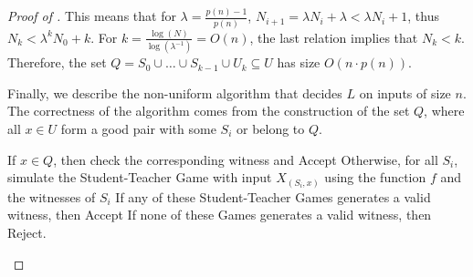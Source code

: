 \documentclass[11pt]{article}
\newcommand{\poly}{\mathsf{poly}}
\theoremstyle{definition}
\theoremstyle{definition}
\theoremstyle{remark}
\begin{document}
\begin{proof}[Proof of ]
    This means that for $\lambda=\frac{p(n)-1}{p(n)}$, $N_{i+1}=\lambda N_i+\lambda<\lambda N_i+1$, thus $N_k<\lambda^k N_0+k$. For $k=\frac{\log(N)}{\log (\lambda^{-1})}=O(n)$, the last relation implies that $N_k<k$. Therefore, the set $Q=S_0\cup\dots\cup S_{k-1}\cup U_k\subseteq U$ has size $O(n\cdot p(n))$.

    Finally, we describe the non-uniform algorithm that decides $L$ on inputs of size $n$. The correctness of the algorithm comes from the construction of the set $Q$, where all $x\in U$ form a good pair with some $S_i$ or belong to $Q$.

\begin{algorithm}[H]
     \caption{The pseudocode of the $\Delta^p_{i+1}/\poly$-algorithm that decides $L$ on input size $n$.}
     \vspace{0.3em}
     If $x\in Q$, then check the corresponding witness and Accept\;
     Otherwise, for all $S_i$, simulate the Student-Teacher Game with input $X_{(S_i,x)}$ using the function $f$ and the witnesses of $S_i$\;
     If any of these Student-Teacher Games generates a valid witness, then Accept\;
     If none of these Games generates a valid witness, then Reject.\\
\end{algorithm}
\end{proof}
\end{document}
